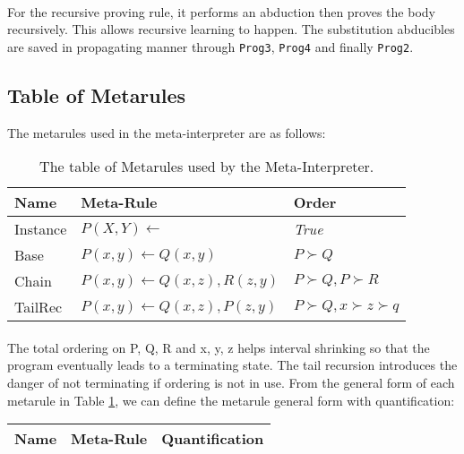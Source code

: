 \documentclass{article}
\theoremstyle{plain}
\theoremstyle{definition}
\begin{document}
\begin{multicols}{2}
\paragraph{} For the recursive proving rule, it performs an abduction then proves the body recursively. This allows recursive learning to happen. The substitution abducibles are saved in propagating manner through \lstinline{Prog3}, \lstinline{Prog4} and finally \lstinline{Prog2}.

\subsection{Table of Metarules}

The metarules used in the meta-interpreter are as follows:

\begin{table}[H]
\centering\footnotesize
\begin{tabular}{ | l | l | l | }
\hline
\textbf{Name} & \textbf{Meta-Rule} & \textbf{Order} \\
\hline
\hline

Instance & $P(X, Y) \leftarrow$ & \textit{True}\\
\hline

Base & $P(x, y) \leftarrow Q(x, y)$ & $P \succ Q$\\
\hline

Chain & $P(x, y) \leftarrow Q(x, z), R(z, y)$ & $P \succ Q, P \succ R$\\
\hline

TailRec & $P(x, y) \leftarrow Q(x, z), P(z, y)$ & $P \succ Q, x \succ z \succ q$\\
\hline
\end{tabular}
\caption{The table of Metarules used by the Meta-Interpreter.}\label{table:MILMetarules}
\end{table}

\paragraph{} The total ordering on P, Q, R and x, y, z helps interval shrinking so that the program eventually leads to a terminating state. The tail recursion introduces the danger of not terminating if ordering is not in use. From the general form of each metarule in Table \ref{table:MILMetarules}, we can define the metarule general form with quantification:

\begin{table}[H]
\centering\footnotesize
\begin{tabular}{ | l | l | l | }
\hline
\textbf{Name} & \textbf{Meta-Rule} & \textbf{Quantification} \\
\hline
\hline


\end{tabular}
\end{table}
\end{multicols}
\end{document}
